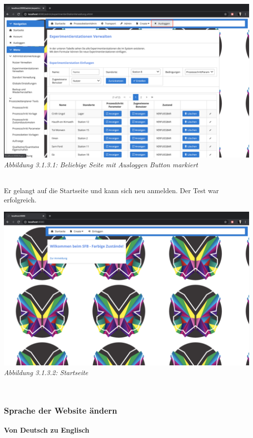 \documentclass[enabledeprecatedfontcommands,fontsize=12pt,paper=a4,twoside]{scrartcl}
\begin{document}
\hypertarget{sc3.1.3.1.1}{
\includegraphics[width=1\textwidth]{Screenshots/31131.png}
\textit{Abbildung 3.1.3.1: Beliebige Seite mit Ausloggen Button markiert}
} \\

Er gelangt auf die Startseite und kann sich neu anmelden. Der Test war erfolgreich. 

\hypertarget{sc3.1.3.2.1}{
\includegraphics[width=1\textwidth]{Screenshots/31132.png}
\textit{Abbildung 3.1.3.2: Startseite}
} \\


\subsubsection{Sprache der Website ändern}

\paragraph{Von Deutsch zu Englisch}
\end{document}

